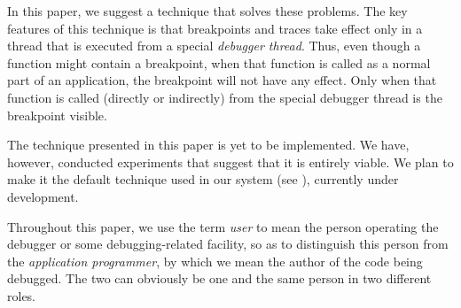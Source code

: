 In this paper, we suggest a technique that solves these problems.  The
key features of this technique is that breakpoints and traces take
effect only in a thread that is executed from a special \emph{debugger
  thread}.  Thus, even though a function might contain a breakpoint,
when that function is called as a normal part of an application, the
breakpoint will not have any effect.  Only when that function is
called (directly or indirectly) from the special debugger thread is
the breakpoint visible.

The technique presented in this paper is yet to be implemented.  We
have, however, conducted experiments that suggest that it is entirely
viable.  We plan to make it the default technique used in our system
\sicl{} (see ), currently under development.

Throughout this paper, we use the term \emph{user} to mean the person
operating the debugger or some debugging-related facility, so as to
distinguish this person from the \emph{application programmer}, by
which we mean the author of the code being debugged.  The two can
obviously be one and the same person in two different roles.
